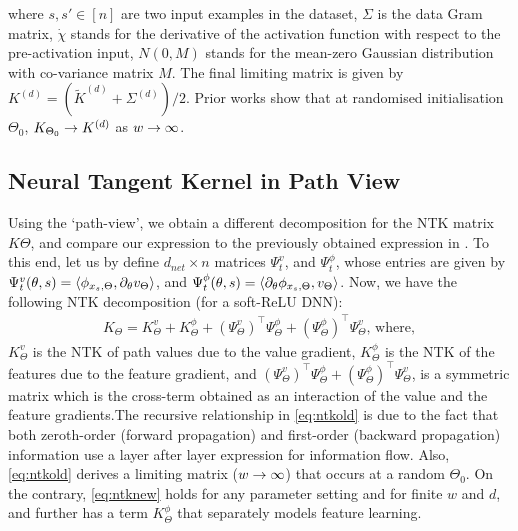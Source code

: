 where $s,s'\in[n]$ are two input examples in the dataset, $\Sigma$ is the data Gram matrix, $\dot{\chi}$ stands for the derivative of the activation function with respect to the pre-activation input, $N(0,M)$ stands for the mean-zero Gaussian distribution with co-variance matrix $M$. The final limiting matrix is given by $K^{(d)}=\left(\tilde{K}^{(d)}+\Sigma^{(d)}\right)/2$. Prior works show that at randomised initialisation $\Theta_0$, $K_{\Theta_0}\rightarrow K^{(d)}$ as $w\rightarrow \infty$.
\subsection{Neural Tangent Kernel in Path View}
Using the `path-view', we obtain a different decomposition for the NTK matrix $K{\Theta}$, and compare our expression to the previously obtained expression in . To this end, let us by define $d_{net}\times n$ matrices $\Psi^v_t$, and $\Psi^{\phi}_t$, whose entries are given by $\Psi^v_t(\theta,s)=\langle \phi_{x_s,\Theta},\partial_{\theta}v_{\Theta}\rangle$, and  $\Psi^{\phi}_t(\theta,s)=\langle \partial_{\theta}\phi_{x_s,\Theta}, v_{\Theta}\rangle$. Now, we have the following NTK decomposition (for a soft-ReLU DNN):
\begin{align}\label{eq:ntknew}
K_{\Theta}=K^v_{\Theta}+K^{\phi}_{\Theta}+(\Psi^v_\Theta)^\top \Psi^{\phi}_{\Theta} +(\Psi^{\phi}_\Theta)^\top \Psi^{v}_{\Theta},\,\text{where},
\end{align}
$K^v_{\Theta}$ is the NTK of path values due to the value gradient, $K^{\phi}_{\Theta}$ is the NTK of the features due to the feature gradient, and $(\Psi^v_\Theta)^\top \Psi^{\phi}_{\Theta} +(\Psi^{\phi}_\Theta)^\top \Psi^{v}_{\Theta}$, is a symmetric matrix which is the cross-term obtained as an interaction of the value and the feature gradients.The recursive relationship in \eqref{eq:ntkold} is due to the fact that both zeroth-order (forward propagation) and first-order (backward propagation) information use a layer after layer expression for information flow. Also, \eqref{eq:ntkold} derives a limiting matrix ($w\rightarrow\infty$) that occurs at a random $\Theta_0$. On the contrary, \eqref{eq:ntknew} holds for any parameter setting and for finite $w$ and $d$, and further has a term $K^{\phi}_{\Theta}$ that separately models feature learning.
